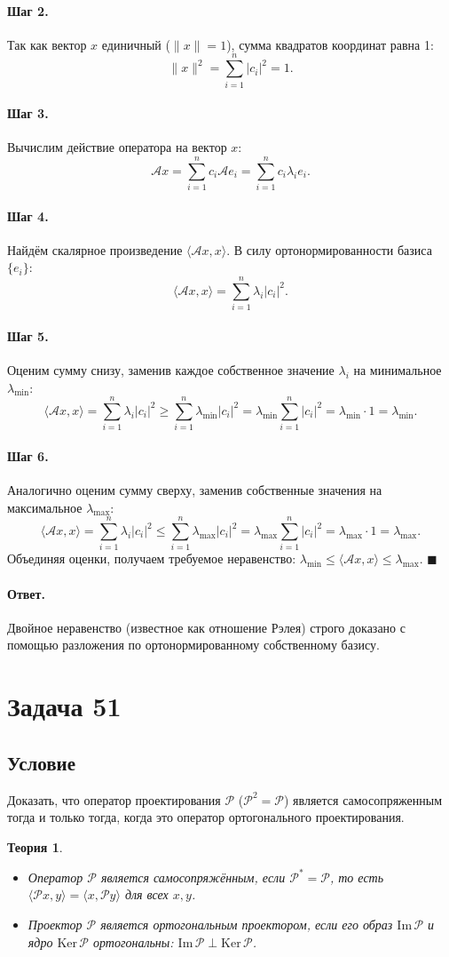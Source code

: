 \documentclass[12pt,a4paper]{article}
\theoremstyle{solution}
\newtheorem*{theory}{Теория}
\newcommand{\task}[1]{\newpage\section*{Задача #1}}
\newcommand{\answer}{\paragraph{Ответ.}}
\newcommand{\step}[1]{\paragraph{Шаг #1.}}
\begin{document}
\step{2} Так как вектор $x$ единичный ($\|x\| = 1$), сумма квадратов координат равна 1:
\[
\|x\|^2 = \sum_{i=1}^n |c_i|^2 = 1.
\]

\step{3} Вычислим действие оператора на вектор $x$:
\[
\mathcal{A}x = \sum_{i=1}^n c_i \mathcal{A}e_i = \sum_{i=1}^n c_i \lambda_i e_i.
\]

\step{4} Найдём скалярное произведение $\langle \mathcal{A}x, x\rangle$. В силу ортонормированности базиса $\{e_i\}$:
\[
\langle \mathcal{A}x, x\rangle = \sum_{i=1}^n \lambda_i |c_i|^2.
\]

\step{5} Оценим сумму снизу, заменив каждое собственное значение $\lambda_i$ на минимальное $\lambda_{\min}$:
\[
\langle \mathcal{A}x, x\rangle = \sum_{i=1}^n \lambda_i |c_i|^2 \geq \sum_{i=1}^n \lambda_{\min} |c_i|^2 = \lambda_{\min} \sum_{i=1}^n |c_i|^2 = \lambda_{\min} \cdot 1 = \lambda_{\min}.
\]

\step{6} Аналогично оценим сумму сверху, заменив собственные значения на максимальное $\lambda_{\max}$:
\[
\langle \mathcal{A}x, x\rangle = \sum_{i=1}^n \lambda_i |c_i|^2 \leq \sum_{i=1}^n \lambda_{\max} |c_i|^2 = \lambda_{\max} \sum_{i=1}^n |c_i|^2 = \lambda_{\max} \cdot 1 = \lambda_{\max}.
\]
Объединяя оценки, получаем требуемое неравенство: $\lambda_{\min} \leq \langle \mathcal{A}x, x\rangle \leq \lambda_{\max}$. \quad$\blacksquare$

\answer
Двойное неравенство (известное как отношение Рэлея) строго доказано с помощью разложения по ортонормированному собственному базису.

\task{51}
\subsection*{Условие}
Доказать, что оператор проектирования $\mathcal{P}$ ($\mathcal{P}^2 = \mathcal{P}$) является самосопряженным тогда и только тогда, когда это оператор ортогонального проектирования.

\begin{theory}
\begin{itemize}
    \item Оператор $\mathcal{P}$ является самосопряжённым, если $\mathcal{P}^* = \mathcal{P}$, то есть $\langle \mathcal{P}x, y\rangle = \langle x, \mathcal{P}y\rangle$ для всех $x, y$.
    \item Проектор $\mathcal{P}$ является ортогональным проектором, если его образ $\mathrm{Im}\,\mathcal{P}$ и ядро $\mathrm{Ker}\,\mathcal{P}$ ортогональны: $\mathrm{Im}\,\mathcal{P} \perp \mathrm{Ker}\,\mathcal{P}$.
\end{itemize}
\end{theory}
\end{document}
